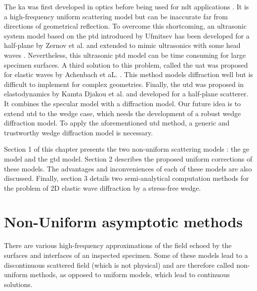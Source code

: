 The \acrfull{ka} was first developed in optics \cite{POoptics} before being used for \acrshort{ndt} applications \cite{Schmerr,Dorval}. It is a high-frequency uniform scattering model but can be inaccurate far from directions of geometrical reflection. To overcome this shortcoming, an ultrasonic system model based on the \acrfull{ptd} introduced by Ufmitsev \cite{Ufmi} has been developed for a half-plane by Zernov et al. \cite{Zernov} and extended to mimic ultrasonics with some head waves \cite{systmodel,FradkinDarmon}. Nevertheless, this ultrasonic \acrshort{ptd} model can be time consuming for large specimen surfaces. A third solution to this problem, called the \acrfull{uat} was proposed for elastic waves by Achenbach et aL. \cite{Achenbach}. This method models diffraction well but is difficult to implement for complex geometries. Finally, the \acrfull{utd} was proposed in elastodynamics by Kamta Djakou et al. \cite{Audrey} and developed for a half-plane scatterer. It combines the specular model with a diffraction model. Our future idea is to extend \acrshort{utd} to the wedge case, which needs the development of a robust wedge diffraction model. To apply the aforementioned \acrshort{utd} method, a generic and trustworthy wedge diffraction model is necessary.

Section 1 of this chapter presents the two non-uniform scattering models : the \acrshort{ge} model and the \acrshort{gtd} model. Section 2 describes the proposed uniform corrections of these models. The advantages and inconveniences of each of these models are also discussed. Finally, section 3 details two semi-analytical computation methods for the problem of 2D elastic wave diffraction by a stress-free wedge.

\section{Non-Uniform asymptotic methods}

There are various high-frequency approximations of the field echoed by the surfaces and interfaces of an inspected specimen. Some of these models lead to a discontinuous scattered field (which is not physical) and are therefore called non-uniform methods, as opposed to uniform models, which lead to continuous solutions.
